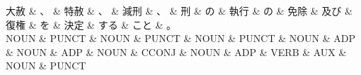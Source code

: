 \documentclass[tikz,border=5pt]{standalone}
\begin{document}
\normalsize
\begin{dependency}[edge unit distance=12.0pt]
    \begin{deptext}[column sep=1em]
        大赦 \& 、 \& 特赦 \& 、 \& 減刑 \& 、 \& 刑 \& の \& 執行 \& の \& 免除 \& 及び \& 復権 \& を \& 決定 \& する \& こと \& 。\\
        NOUN \& PUNCT \& NOUN \& PUNCT \& NOUN \& PUNCT \& NOUN \& ADP \& NOUN \& ADP \& NOUN \& CCONJ \& NOUN \& ADP \& VERB \& AUX \& NOUN \& PUNCT\\
    \end{deptext}
\end{dependency}
\end{document}
